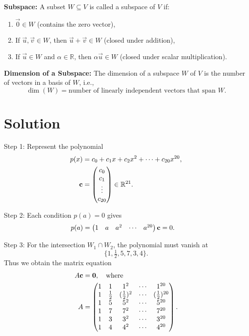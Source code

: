 \documentclass[12pt]{article}
\begin{document}
\textbf{Subspace:}  
A subset $W \subseteq V$ is called a subspace of $V$ if:
\begin{enumerate}
    \item $\vec{0} \in W$ (contains the zero vector),
    \item If $\vec{u},\vec{v}\in W$, then $\vec{u}+\vec{v}\in W$ (closed under addition),
    \item If $\vec{u}\in W$ and $\alpha \in \mathbb{R}$, then $\alpha \vec{u} \in W$ (closed under scalar multiplication).
\end{enumerate}

\textbf{Dimension of a Subspace:}  
The dimension of a subspace $W$ of $V$ is the number of vectors in a basis of $W$, i.e.,
\[
\dim(W) = \text{number of linearly independent vectors that span } W.
\]

\section*{Solution}

\noindent
Step 1: Represent the polynomial
\begin{align}
p(x) &= c_0 + c_1x + c_2x^2 + \cdots + c_{20}x^{20}, \\
\mathbf{c} &= \begin{pmatrix}c_0 \\ c_1 \\ \vdots \\ c_{20}\end{pmatrix} \in \mathbb{R}^{21}.
\end{align}

\noindent
Step 2: Each condition $p(a)=0$ gives
\begin{align}
p(a) &= \begin{pmatrix}1 & a & a^2 & \cdots & a^{20}\end{pmatrix} \mathbf{c} = 0.
\end{align}

\noindent
Step 3: For the intersection $W_1 \cap W_2$, the polynomial must vanish at 
\[
\{1,\tfrac12,5,7,3,4\}.
\]
Thus we obtain the matrix equation
\begin{align}
A \mathbf{c} &= \mathbf{0}, \quad \text{where} \\
A &= \begin{pmatrix}
1 & 1 & 1^2 & \cdots & 1^{20} \\
1 & \tfrac12 & (\tfrac12)^2 & \cdots & (\tfrac12)^{20} \\
1 & 5 & 5^2 & \cdots & 5^{20} \\
1 & 7 & 7^2 & \cdots & 7^{20} \\
1 & 3 & 3^2 & \cdots & 3^{20} \\
1 & 4 & 4^2 & \cdots & 4^{20}
\end{pmatrix}.
\end{align}
\end{document}
